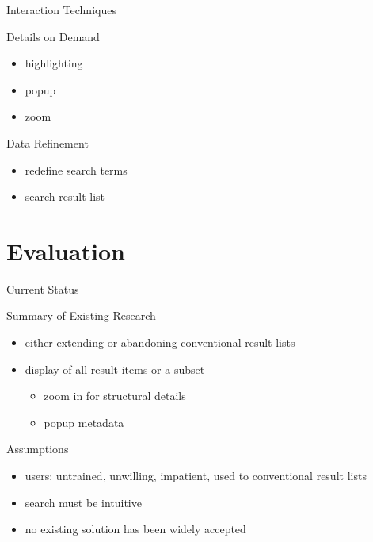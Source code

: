 \documentclass{beamer}
\begin{document}
\begin{frame}{Interaction Techniques}
	\begin{beamerboxesrounded}[shadow=true]{Details on Demand}
		\begin{itemize}
			\item highlighting \cite{Weiss2001}
			\item popup \cite{Einsfeld2006}
			\item zoom \cite{Konchady1998, Mukherjea1996, Paulovich2008, Rauber2000}
		\end{itemize}
	\end{beamerboxesrounded}
	\vspace{5mm} \pause
	\begin{beamerboxesrounded}[shadow=true]{Data Refinement}
		\begin{itemize}
			\item redefine search terms \cite{Roussinov1999}
			\item search result list \cite{Einsfeld2006, Mukherjea1999}
		\end{itemize}
	\end{beamerboxesrounded}
\end{frame}

\section{Evaluation}
\begin{frame}{Current Status}
	\begin{beamerboxesrounded}[shadow=true]{Summary of Existing Research}
		\begin{itemize}
			\item either extending or abandoning conventional result lists
			\item display of all result items or a subset \begin{itemize}
				\item zoom in for structural details
				\item popup metadata
			\end{itemize}
		\end{itemize}
	\end{beamerboxesrounded}
	\vspace{5mm} \pause
	\begin{beamerboxesrounded}[shadow=true]{Assumptions}
		\begin{itemize}
			\item users: untrained, unwilling, impatient, used to conventional result lists
			\item search must be intuitive
			\item no existing solution has been widely accepted
		\end{itemize}
	\end{beamerboxesrounded}
\end{frame}
\end{document}
